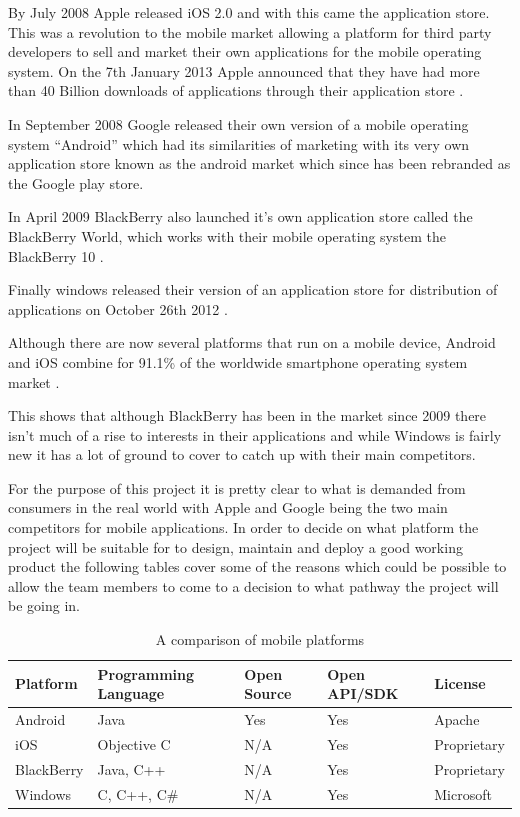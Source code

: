 By July 2008 Apple released iOS 2.0 and with this came the application store.
This was a revolution to the mobile market allowing a platform for third party
developers to sell and market their own applications for the mobile operating
system. On the 7th January 2013 Apple announced that they have had more than 40
Billion downloads of applications  through their application store
\citep{40billion12}.

In September 2008 Google released their own version of a mobile operating system
``Android'' which had its similarities of marketing with its very own application store known as the android market which since has been rebranded as the Google play store.

In April 2009 BlackBerry also launched it's own application store called the
BlackBerry World, which works with their mobile operating system the BlackBerry
10 \citep{bbworld09}.

Finally windows released their version of an application store for distribution 
of applications on October 26th 2012 \citep{windows8}.

Although there are now several platforms that run on a mobile device, Android
and iOS combine for 91.1\% of the worldwide smartphone operating system market \citep{idc13}.

This shows that although BlackBerry has been in the market since 2009 there
isn't much of a rise to interests in their applications and while Windows is 
fairly new it has a lot of ground to cover to catch up with their main 
competitors.

For the purpose of this project it is pretty clear to what is demanded from
consumers in the real world with Apple and Google being the two main competitors
for mobile applications. In order to decide on what platform the project will be
suitable for to design, maintain and deploy a good working product the following tables cover some of the reasons which could be
possible to allow the team members to come to a decision to what pathway the
project will be going in.

\begin{table}[H]
  \centering
  \small
  \begin{tabular}{|p{2cm}|p{3cm}|p{2cm}|p{2.5cm}|p{2.5cm}|}
  \hline
  \textbf{Platform} & \textbf{Programming Language} & \textbf{Open Source} &
  \textbf{Open API/SDK} & \textbf{License} \\ \hline
  Android & Java & Yes & Yes & Apache \\ \hline
  iOS & Objective C & N/A & Yes & Proprietary \\ \hline
  BlackBerry & Java, C++ & N/A & Yes & Proprietary \\ \hline
  Windows & C, C++, C\#& N/A & Yes & Microsoft \\ \hline 
  \end{tabular}
  \caption {A comparison of mobile platforms}
\end{table}


